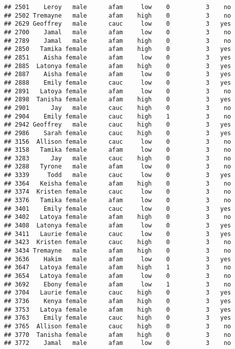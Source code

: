 \documentclass[
]{article}
\begin{document}
\begin{verbatim}
## 2501    Leroy   male      afam     low    0          3    no
## 2502 Tremayne   male      afam    high    0          3    no
## 2629 Geoffrey   male      cauc     low    0          3   yes
## 2700    Jamal   male      afam     low    0          3    no
## 2789    Jamal   male      afam    high    0          3    no
## 2850   Tamika female      afam    high    0          3   yes
## 2851    Aisha female      afam     low    0          3   yes
## 2885  Latonya female      afam    high    0          3   yes
## 2887    Aisha female      afam     low    0          3   yes
## 2888    Emily female      cauc     low    0          3   yes
## 2891   Latoya female      afam     low    0          3    no
## 2898  Tanisha female      afam    high    0          3   yes
## 2901      Jay   male      cauc    high    0          3    no
## 2904    Emily female      cauc    high    1          3    no
## 2942 Geoffrey   male      cauc    high    0          3   yes
## 2986    Sarah female      cauc    high    0          3   yes
## 3156  Allison female      cauc     low    0          3    no
## 3158   Tamika female      afam     low    0          3    no
## 3283      Jay   male      cauc    high    0          3    no
## 3288   Tyrone   male      afam     low    0          3    no
## 3339     Todd   male      cauc     low    0          3   yes
## 3364   Keisha female      afam    high    0          3    no
## 3374  Kristen female      cauc     low    0          3    no
## 3376   Tamika female      afam     low    0          3    no
## 3401    Emily female      cauc     low    0          3   yes
## 3402   Latoya female      afam    high    0          3    no
## 3408  Latonya female      afam     low    0          3   yes
## 3411   Laurie female      cauc     low    0          3   yes
## 3423  Kristen female      cauc    high    0          3    no
## 3434 Tremayne   male      afam    high    0          3    no
## 3636    Hakim   male      afam     low    0          3   yes
## 3647   Latoya female      afam    high    1          3    no
## 3654   Latoya female      afam     low    0          3    no
## 3692    Ebony female      afam     low    1          3    no
## 3704   Laurie female      cauc    high    0          3   yes
## 3736    Kenya female      afam    high    0          3   yes
## 3753   Latoya female      afam    high    0          3   yes
## 3763    Emily female      cauc    high    0          3   yes
## 3765  Allison female      cauc    high    0          3    no
## 3770  Tanisha female      afam    high    0          3    no
## 3772    Jamal   male      afam     low    0          3    no

\end{verbatim}
\end{document}
